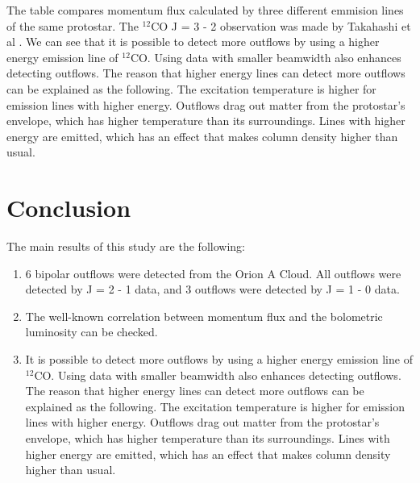 \documentclass[twoside,11pt]{gshs_thesis}
\begin{document}
The table compares momentum flux calculated by three different emmision lines of the same protostar. The $^{12}$CO J = 3 - 2 observation was made by Takahashi et al \cite{Takahashi}. We can see that it is possible to detect more outflows by using a higher energy emission line of $^{12}$CO. Using data with smaller beamwidth also enhances detecting outflows. The reason that higher energy lines can detect more outflows can be explained as the following. The excitation temperature is higher for emission lines with higher energy. Outflows drag out matter from the protostar's envelope, which has higher temperature than its surroundings. Lines with higher energy are emitted, which has an effect that makes column density higher than usual.

\newpage

\section{Conclusion}
The main results of this study are the following:
\begin{enumerate}
	\item 6 bipolar outflows were detected from the Orion A Cloud. All outflows were detected by J = 2 - 1 data, and 3 outflows were detected by J = 1 - 0 data.\\
	
	\item The well-known correlation between momentum flux and the bolometric luminosity can be checked. \\
	
	\item It is possible to detect more outflows by using a higher energy emission line of $^{12}$CO. Using data with smaller beamwidth also enhances detecting outflows. The reason that higher energy lines can detect more outflows can be explained as the following. The excitation temperature is higher for emission lines with higher energy. Outflows drag out matter from the protostar's envelope, which has higher temperature than its surroundings. Lines with higher energy are emitted, which has an effect that makes column density higher than usual.\\
	
\end{enumerate}
\end{document}
